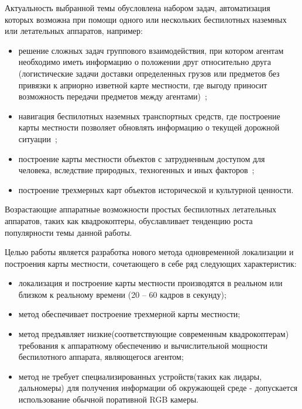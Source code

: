 Актуальность выбранной темы обусловлена набором задач, автоматизация которых возможна при помощи одного или нескольких беспилотных наземных или летательных аппаратов, например:
\begin{itemize}
    \item решение сложных задач группового взаимодействия, при котором агентам необходимо иметь информацию о положении друг относительно друга (логистические задачи доставки определенных грузов или предметов без привязки к априорно изветной карте местности, где выгоду приносит возможность передачи предметов между агентами)~\cite{beerSLAM};
    \item навигация беспилотных наземных транспортных средств, где построение карты местности позволяет обновлять информацию о текущей дорожной ситуации~\cite{kittyDataset};
    \item построение карты местности объектов с затрудненным доступом для человека, вследствие природных, техногенных и иных факторов~\cite{tum3DMonoSLAM};
    \item построение трехмерных карт объектов исторической и культурной ценности.
\end{itemize}
Возрастающие аппаратные возможности простых беспилотных летательных аппаратов, таких как квадрокоптеры, обуславливает тенденцию роста~\cite{tum3DMonoSLAM} популярности темы данной работы.


Целью работы является разработка нового метода одновременной локализации и построения карты местности, сочетающего в себе ряд следующих характеристик:
\begin{itemize}
    \item локализация и построение карты местности производятся в реальном или близком к реальному времени (20 -- 60 кадров в секунду);
    \item метод обеспечивает построение трехмерной карты местности;
    \item метод предъявляет низкие(соответствующие современным квадрокоптерам) требования к аппаратному обеспечению и вычислительной мощности беспилотного аппарата, являющегося агентом;
    \item метод не требует специализированных устройств(таких как лидары, дальномеры) для получения информации об окружающей среде - допускается использование обычной поративной RGB камеры.
\end{itemize}
 

